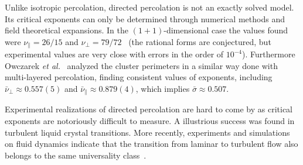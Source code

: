 Unlike isotropic percolation, directed percolation is not an exactly solved
model. Its critical exponents can only be determined through numerical methods
and field theoretical expansions. In the $(1+1)$-dimensional case the values
found were $\nu_\parallel=26/15$ and $\nu_\perp=79/72$~\cite{Hinrichsen2000}
(the rational forms are conjectured, but experimental values are very close
with errors in the order of $10^{-4}$). Furthermore Owczarek \textit{et
al.}~\cite{Owczarek1997} analyzed the cluster perimeters in a similar way
done with multi-layered percolation, finding consistent values of exponents,
including $\bar{\nu}_\perp\approx0.557(5)$ and
$\bar{\nu}_\parallel\approx0.879(4)$, which implies $\bar{\sigma}\approx0.507$.

Experimental realizations of directed percolation are hard to come by as
critical exponents are notoriously difficult to measure. A illustrious success
was found in turbulent liquid crystal transitions. More recently, experiments
and simulations on fluid dynamics indicate that the transition from laminar to
turbulent flow also belongs to the same universality class~\cite{Lemoult2016}.

